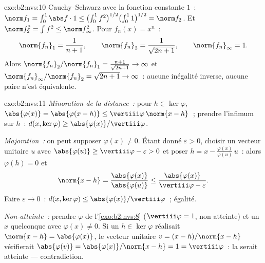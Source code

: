 \begin{solution}{exo:b2:nvs:10}
Cauchy--Schwarz avec la fonction constante $1$~: $\norm f_1 =
\int_0^1 \abs f\cdot 1 \leq \bigl(\int_0^1
f^2\bigr)^{1/2}\bigl(\int_0^1 1\bigr)^{1/2} = \norm f_2$. Et
$\norm f_2^2 = \int f^2 \leq \norm f_\infty^2$. Pour $f_n(x) =
x^n$~:
\[
\norm{f_n}_1 = \frac1{n+1}, \qquad
\norm{f_n}_2 = \frac1{\sqrt{2n+1}}, \qquad
\norm{f_n}_\infty = 1 .
\]
Alors $\norm{f_n}_2/\norm{f_n}_1 = \frac{n+1}{\sqrt{2n+1}} \to
\infty$ et $\norm{f_n}_\infty/\norm{f_n}_2 = \sqrt{2n+1} \to
\infty$~: aucune inégalité inverse, aucune paire n'est équivalente.
\end{solution}

\begin{solution}{exo:b2:nvs:11}
\emph{Minoration de la distance~:} pour $h \in \ker\varphi$,
$\abs{\varphi(x)} = \abs{\varphi(x - h)} \leq
\vertiii\varphi\,\norm{x - h}$~; prendre l'infimum sur $h$~:
$d(x, \ker\varphi) \geq \abs{\varphi(x)}/\vertiii\varphi$.

\emph{Majoration~:} on peut supposer $\varphi(x) \neq 0$. Étant donné
$\varepsilon > 0$, choisir un vecteur unitaire $u$ avec $\abs{\varphi(u)} \geq
\vertiii\varphi - \varepsilon > 0$ et poser $h = x -
\frac{\varphi(x)}{\varphi(u)}\,u$~: alors $\varphi(h) = 0$ et
\[
\norm{x - h} = \frac{\abs{\varphi(x)}}{\abs{\varphi(u)}}
\leq \frac{\abs{\varphi(x)}}{\vertiii\varphi - \varepsilon}.
\]
Faire $\varepsilon \to 0$~: $d(x, \ker\varphi) \leq
\abs{\varphi(x)}/\vertiii\varphi$~; égalité.

\emph{Non-atteinte~:} prendre $\varphi$ de l'\cref{exo:b2:nvs:8}
($\vertiii\varphi = 1$, non atteinte) et un $x$ quelconque avec
$\varphi(x) \neq 0$. Si un $h \in \ker\varphi$ réalisait
$\norm{x - h} = \abs{\varphi(x)}$, le vecteur unitaire $v = (x -
h)/\norm{x - h}$ vérifierait $\abs{\varphi(v)} =
\abs{\varphi(x)}/\norm{x - h} = 1 = \vertiii\varphi$~: la
 serait atteinte --- contradiction.
\end{solution}

